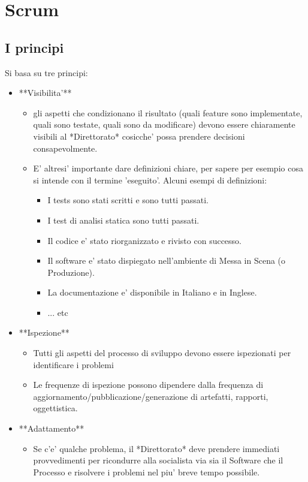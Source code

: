 \chapter{Scrum}

\section{I principi}

Si basa su tre principi:
\begin{itemize}
  \item **Visibilita'**
  \begin{itemize}
    \item gli aspetti che condizionano il risultato (quali feature sono implementate, quali sono testate, quali sono da modificare) devono essere chiaramente visibili al *Direttorato* cosicche' possa prendere decisioni consapevolmente.
    \item E' altresi' importante dare definizioni chiare, per sapere per esempio cosa si intende con il termine 'eseguito'. Alcuni esempi di definizioni:
    \begin{itemize}
      \item I tests sono stati scritti e sono tutti passati.
      \item I test di analisi statica sono tutti passati.
      \item Il codice e' stato riorganizzato e rivisto con successo.
      \item Il software e' stato dispiegato nell'ambiente di Messa in Scena (o Produzione).
      \item La documentazione e' disponibile in Italiano e in Inglese.
      \item ... etc
    \end{itemize}
  \end{itemize}
  \item **Ispezione**
  \begin{itemize}
    \item Tutti gli aspetti del processo di sviluppo devono essere ispezionati per identificare i problemi
    \item Le frequenze di ispezione possono dipendere dalla frequenza di aggiornamento/pubblicazione/generazione di artefatti, rapporti, oggettistica.
  \end{itemize}
  \item **Adattamento**
  \begin{itemize}
    \item Se c'e' qualche problema, il *Direttorato* deve prendere immediati provvedimenti per ricondurre alla socialista via sia il Software che il Processo e risolvere i problemi nel piu' breve tempo possibile.
  \end{itemize}
\end{itemize}


